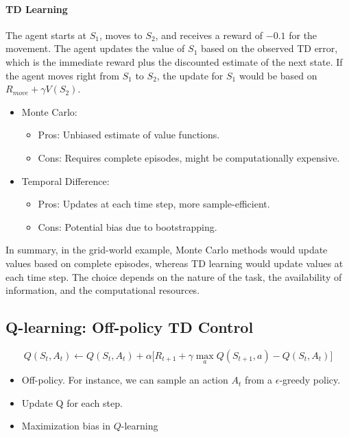 \paragraph{TD Learning} The agent starts at $S_1$, moves to $S_2$, and receives a reward of $-0.1$ for the movement. The agent updates the value of $S_1$ based on the observed TD error, which is the immediate reward plus the discounted estimate of the next state. If the agent moves right from $S_1$ to $S_2$, the update for $S_1$ would be based on $R_{move}+\gamma V(S_2)$.

\begin{itemize}
	\item Monte Carlo:
		\begin{itemize}
			\item Pros: Unbiased estimate of value functions.
			\item Cons: Requires complete episodes, might be computationally expensive.
		\end{itemize}
	\item Temporal Difference:
		\begin{itemize}
			\item Pros: Updates at each time step, more sample-efficient.
			\item Cons: Potential bias due to bootstrapping.
		\end{itemize}
\end{itemize}
In summary, in the grid-world example, Monte Carlo methods would update values based on complete episodes, whereas TD learning would update values at each time step. The choice depends on the nature of the task, the availability of information, and the computational resources.

\subsection{Q-learning: Off-policy TD Control}

$$Q(S_t, A_t) \leftarrow Q(S_t, A_t)+ \alpha \Big[R_{t+1}+\gamma \max_a Q(S_{t+1}, a)-Q(S_t, A_t)\Big] $$

\begin{itemize}
	\item Off-policy. For instance, we can sample an action $A_t$ from a $\epsilon$-greedy policy. 
	\item Update Q for each step.
	\item Maximization bias in $Q$-learning
\end{itemize}

